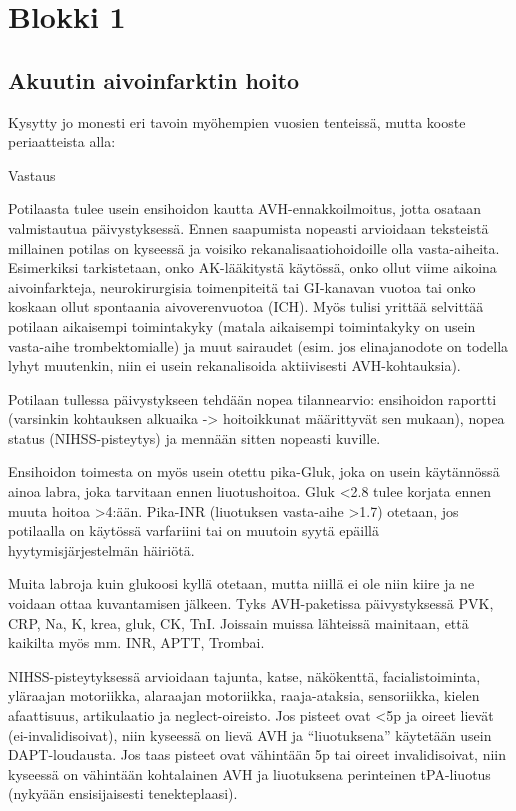 \documentclass[
]{book}
\begin{document}
\section{Blokki 1}\label{blokki-1-4}

\subsection{Akuutin aivoinfarktin hoito}\label{akuutin-aivoinfarktin-hoito}

Kysytty jo monesti eri tavoin myöhempien vuosien tenteissä, mutta kooste periaatteista alla:

Vastaus

Potilaasta tulee usein ensihoidon kautta AVH-ennakkoilmoitus, jotta osataan valmistautua päivystyksessä. Ennen saapumista nopeasti arvioidaan teksteistä millainen potilas on kyseessä ja voisiko rekanalisaatiohoidoille olla vasta-aiheita. Esimerkiksi tarkistetaan, onko AK-lääkitystä käytössä, onko ollut viime aikoina aivoinfarkteja, neurokirurgisia toimenpiteitä tai GI-kanavan vuotoa tai onko koskaan ollut spontaania aivoverenvuotoa (ICH). Myös tulisi yrittää selvittää potilaan aikaisempi toimintakyky (matala aikaisempi toimintakyky on usein vasta-aihe trombektomialle) ja muut sairaudet (esim. jos elinajanodote on todella lyhyt muutenkin, niin ei usein rekanalisoida aktiivisesti AVH-kohtauksia).

Potilaan tullessa päivystykseen tehdään nopea tilannearvio: ensihoidon raportti (varsinkin kohtauksen alkuaika -\textgreater{} hoitoikkunat määrittyvät sen mukaan), nopea status (NIHSS-pisteytys) ja mennään sitten nopeasti kuville.

Ensihoidon toimesta on myös usein otettu pika-Gluk, joka on usein käytännössä ainoa labra, joka tarvitaan ennen liuotushoitoa. Gluk \textless2.8 tulee korjata ennen muuta hoitoa \textgreater4:ään. Pika-INR (liuotuksen vasta-aihe \textgreater1.7) otetaan, jos potilaalla on käytössä varfariini tai on muutoin syytä epäillä hyytymisjärjestelmän häiriötä.

Muita labroja kuin glukoosi kyllä otetaan, mutta niillä ei ole niin kiire ja ne voidaan ottaa kuvantamisen jälkeen. Tyks AVH-paketissa päivystyksessä PVK, CRP, Na, K, krea, gluk, CK, TnI. Joissain muissa lähteissä mainitaan, että kaikilta myös mm. INR, APTT, Trombai.

NIHSS-pisteytyksessä arvioidaan tajunta, katse, näkökenttä, facialistoiminta, yläraajan motoriikka, alaraajan motoriikka, raaja-ataksia, sensoriikka, kielen afaattisuus, artikulaatio ja neglect-oireisto. Jos pisteet ovat \textless5p ja oireet lievät (ei-invalidisoivat), niin kyseessä on lievä AVH ja ``liuotuksena'' käytetään usein DAPT-loudausta. Jos taas pisteet ovat vähintään 5p tai oireet invalidisoivat, niin kyseessä on vähintään kohtalainen AVH ja liuotuksena perinteinen tPA-liuotus (nykyään ensisijaisesti tenekteplaasi).
\end{document}
